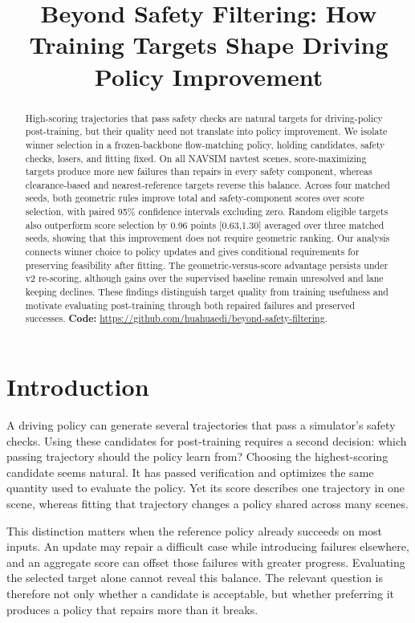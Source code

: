 \documentclass[letterpaper,10pt,conference]{ieeeconf}
\title{Beyond Safety Filtering: How Training Targets Shape Driving Policy Improvement}
\author{\phantom{Anonymous Authors}}
\begin{document}
\raggedbottom
\maketitle
\begin{abstract}
High-scoring trajectories that pass safety checks are natural targets for driving-policy post-training, but their quality need not translate into policy improvement. We isolate winner selection in a frozen-backbone flow-matching policy, holding candidates, safety checks, losers, and fitting fixed. On all NAVSIM navtest scenes, score-maximizing targets produce more new failures than repairs in every safety component, whereas clearance-based and nearest-reference targets reverse
this balance. Across four matched seeds, both geometric rules improve total and safety-component scores over score selection, with paired 95\% confidence intervals excluding zero. Random eligible targets also outperform score selection by 0.96 points
[0.63,1.30] averaged over three matched seeds, showing that this improvement does not require geometric ranking. Our analysis connects winner choice to policy updates and gives conditional requirements for preserving feasibility after fitting. The
geometric-versus-score advantage persists under v2 re-scoring, although gains over the supervised baseline remain unresolved and lane keeping declines. These findings distinguish target
quality from training usefulness and motivate evaluating
post-training through both repaired failures and preserved
successes.
\noindent\textbf{Code:} \url{https://github.com/huahuaedi/beyond-safety-filtering}.
\end{abstract}


\section{Introduction}
A driving policy can generate several trajectories that pass a simulator's safety checks. Using these candidates for post-training requires a second decision: which passing trajectory should the policy learn from? Choosing the highest-scoring candidate seems natural. It has passed verification and optimizes the same quantity used to evaluate the policy. Yet its score describes one trajectory in one scene, whereas fitting that trajectory changes a policy shared across many scenes.

This distinction matters when the reference policy already succeeds on most inputs. An update may repair a difficult case while introducing failures elsewhere, and an aggregate score can offset those failures with greater progress. Evaluating the selected target alone cannot reveal this balance. The relevant question is therefore not only whether a candidate is acceptable, but whether preferring it produces a policy that repairs more than it breaks.
\end{document}
